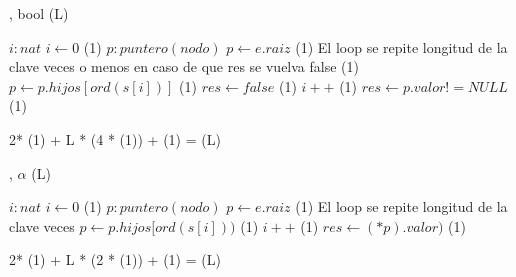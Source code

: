 {   ,
    }
    {bool}
    {\bigo(L)}
{
	\var $i : nat$
	\State $ i \gets 0$  												\comment \bigo(1) 
	\var $p : puntero(nodo)$ 
	\State $ p \gets e.raiz$											\comment \bigo(1)    
	\Statex             \comment El loop se repite longitud de la clave veces o menos en caso de que res se vuelva false
		                      			\comment \bigo(1)
		 	\State $p \gets p.hijos[ord(s[i])]$							\comment \bigo(1)
		 \Else
            \State $res \gets false$  									\comment \bigo(1)
     	 \EndIf	
     	\State $i++$   													\comment \bigo(1) 
    \EndWhile		
	\State $res \gets p.valor != NULL$									\comment \bigo(1)	

}	{  2* \bigo(1) + L * (4 * \bigo(1)) + \bigo(1) = \bigo(L) }


{   ,
    }
    {$\alpha$}
    {\bigo(L)}
{
	\var $i : nat$
	\State $ i \gets 0$  												\comment \bigo(1) 
	\var $p : puntero(nodo)$ 
	\State $ p \gets e.raiz$											\comment \bigo(1)  
     	\Statex             \comment El loop se repite longitud de la clave veces
     	\State $p \gets p.hijos[ord(s[i]))$								\comment \bigo(1)
     	\State $i++$   													\comment \bigo(1) 
    \EndWhile		
	\State $res \gets (*p).valor)$										\comment \bigo(1)												 

}	{  2* \bigo(1) + L * (2 * \bigo(1)) + \bigo(1) = \bigo(L) }

